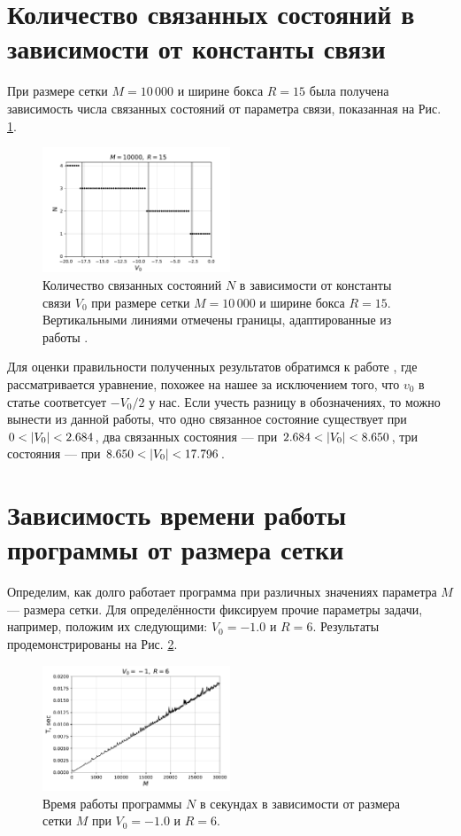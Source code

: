 \documentclass[10pt]{article}
\begin{document}
\section{Количество связанных состояний в зависимости от константы связи}

При размере сетки $M=10\, 000$ и ширине бокса $R=15$ была получена зависимость числа связанных состояний от параметра связи, показанная на Рис. \ref{fig:n_vs_v0}.
\begin{figure}[htbp]
    \centering
    \includegraphics[width=0.5\textwidth]{../figures/num_eigen_vs_v0}
    \caption{Количество связанных состояний $N$ в зависимости от константы связи $V_0$ при размере сетки $M=10\, 000$ и ширине бокса $R=15$. Вертикальными линиями отмечены границы, адаптированные из работы \cite{article}.}
    \label{fig:n_vs_v0}
\end{figure}
Для оценки правильности полученных результатов обратимся к работе \cite{article}, где рассматривается уравнение, похожее на нашее за исключением того, что $v_0$ в статье соответсует $-V_0/2$ у нас. Если учесть разницу в обозначениях, то можно вынести из данной работы, что одно связанное состояние существует при $0 < \abs{V_0} < 2.684$, два связанных состояния --- при $2.684 < \abs{V_0} < 8.650$, три состояния --- при $8.650 < \abs{V_0} < 17.796$. 


\section{Зависимость времени работы программы от размера сетки}

Определим, как долго работает программа при различных значениях параметра $M$ --- размера сетки. Для определённости фиксируем прочие параметры задачи, например, положим их следующими: $V_0 = -1.0$ и $R=6$. Результаты продемонстрированы на Рис. \ref{fig:T_vs_M}.
\begin{figure}[htbp]
    \centering
    \includegraphics[width=0.5\textwidth]{../figures/T_vs_M}
    \caption{Время работы программы $N$ в секундах в зависимости от размера сетки $M$ при $V_0 = -1.0$ и $R=6$.}
    \label{fig:T_vs_M}
\end{figure} 
\end{document}
